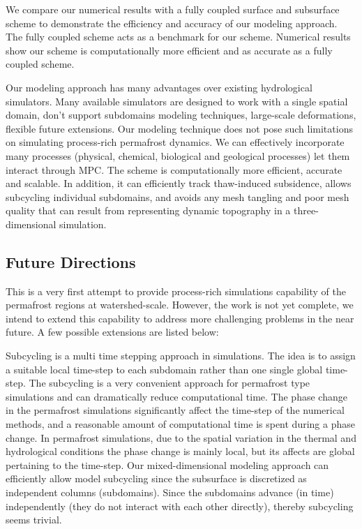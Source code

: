 \documentclass[review]{elsarticle}
\begin{document}
We compare our numerical results with a fully coupled surface and subsurface scheme to demonstrate the efficiency and accuracy of our modeling approach. The fully coupled scheme acts as a benchmark for our scheme. Numerical results show our scheme is computationally more efficient and as accurate as a fully coupled scheme. 

Our modeling approach has many advantages over existing hydrological simulators. Many available simulators are designed to work with a single spatial domain, don't support subdomains modeling techniques, large-scale deformations, flexible future extensions. Our modeling technique does not pose such limitations on simulating process-rich permafrost dynamics. We can effectively incorporate many processes (physical, chemical, biological and geological processes) let them interact through MPC.  The scheme is computationally more efficient, accurate and scalable. In addition, it can efficiently track thaw-induced subsidence, allows subcycling individual subdomains, and avoids any mesh tangling and poor mesh quality that can result from representing dynamic topography in a three-dimensional simulation.
 

 
\subsection{Future Directions}
This is a very first attempt to provide process-rich simulations capability of the permafrost regions at watershed-scale. However, the work is not yet complete, we intend to  extend this capability to address more challenging problems in the near future. A few possible extensions are listed below:


Subcycling is a multi time stepping approach in simulations. The idea is to assign a suitable local time-step to each subdomain rather than one single global time-step. The subcycling is a very convenient approach for permafrost type simulations and can dramatically reduce computational time. The phase change in the permafrost simulations significantly affect the time-step of the numerical methods, and a reasonable amount of computational time is spent during a phase change. In permafrost simulations, due to the spatial variation in the thermal and hydrological conditions the phase change is mainly local, but its affects are global pertaining to the time-step. Our mixed-dimensional modeling approach can efficiently allow model subcycling since the subsurface is discretized as independent columns (subdomains). Since the subdomains advance (in time) independently (they do not interact with each other directly), thereby subcycling seems trivial. 
\end{document}
